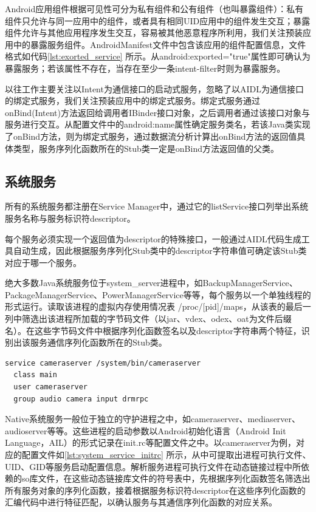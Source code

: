 \documentclass[winfonts,master,twoside]{njuthesis}
\begin{document}
Android应用组件根据可见性可分为私有组件和公有组件（也叫暴露组件）：私有组件只允许与同一应用中的组件，或者具有相同UID应用中的组件发生交互；暴露组件允许与其他应用程序发生交互，容易被其他恶意程序所利用，我们关注预装应用中的暴露服务组件。AndroidManifest文件中包含该应用的组件配置信息，文件格式如代码\ref{lst:exorted_service} 所示。从android:exported="true"属性即可确认为暴露服务；若该属性不存在，当存在至少一条intent-filter时则为暴露服务。


以往工作\cite{zhang2017systematically}\cite{yang2014intentfuzzer}主要关注以Intent为通信接口的启动式服务，忽略了以AIDL为通信接口的绑定式服务，我们关注预装应用中的绑定式服务。绑定式服务通过onBind(Intent)方法返回给调用者IBinder接口对象，之后调用者通过该接口对象与服务进行交互。从配置文件中的android:name属性确定服务类名，若该Java类实现了onBind方法，则为绑定式服务，通过数据流分析计算出onBind方法的返回值具体类型，服务序列化函数所在的Stub类一定是onBind方法返回值的父类。



\subsection{系统服务}

所有的系统服务都注册在Service Manager中，通过它的listService接口列举出系统服务名称与服务标识符descriptor。

每个服务必须实现一个返回值为descriptor的特殊接口，一般通过AIDL代码生成工具自动生成，因此根据服务序列化Stub类中的descriptor字符串值可确定该Stub类对应于哪一个服务。

绝大多数Java系统服务位于system\_server进程中，如BackupManagerService、PackageManagerService、PowerManagerService等等，每个服务以一个单独线程的形式运行。读取该进程的虚拟内存使用情况表 /proc/[pid]/maps，从该表的最后一列中筛选出该进程所加载的字节码文件（以jar、vdex、odex、oat为文件后缀名）。在这些字节码文件中根据序列化函数签名以及descriptor字符串两个特征，识别出该服务通信序列化函数所在的Stub类。

\begin{lstlisting}[caption={cameraserver.rc配置文件},label={lst:system_service_initrc}] 
service cameraserver /system/bin/cameraserver
  class main
  user cameraserver
  group audio camera input drmrpc
\end{lstlisting}

Native系统服务一般位于独立的守护进程之中，如cameraserver、mediaserver、audioserver等等。这些进程的启动参数以Android初始化语言（Android Init Language，AIL）的形式记录在init.rc等配置文件之中。以cameraserver为例，对应的配置文件如\ref{lst:system_service_initrc} 所示，从中可提取出进程可执行文件、UID、GID等服务启动配置信息。解析服务进程可执行文件在动态链接过程中所依赖的so库文件，在这些动态链接库文件的符号表中，先根据序列化函数签名筛选出所有服务对象的序列化函数，接着根据服务标识符descriptor在这些序列化函数的汇编代码中进行特征匹配，以确认服务与其通信序列化函数的对应关系。
\end{document}
